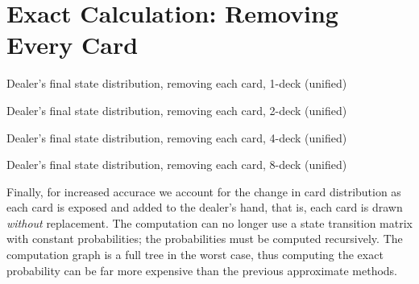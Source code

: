 \section{Exact Calculation: Removing Every Card}
\label{sec:dealer:exact}

\begin{table}[ht!]
\caption{Dealer's final state distribution, removing each card, 1-deck (unified)}
\begin{center}

\end{center}
\label{tab:dealer-final-unified-exact-1}
\end{table}

\begin{table}[ht!]
\caption{Dealer's final state distribution, removing each card, 2-deck (unified)}
\begin{center}

\end{center}
\label{tab:dealer-final-unified-exact-2}
\end{table}

\begin{table}[ht!]
\caption{Dealer's final state distribution, removing each card, 4-deck (unified)}
\begin{center}

\end{center}
\label{tab:dealer-final-unified-exact-4}
\end{table}

\begin{table}[ht!]
\caption{Dealer's final state distribution, removing each card, 8-deck (unified)}
\begin{center}

\end{center}
\label{tab:dealer-final-unified-exact-8}
\end{table}

Finally, for increased accurace we account for the change in 
card distribution as each card is exposed and added to the dealer's hand, 
that is, each card is drawn \emph{without} replacement.
The computation can no longer use a state transition matrix with
constant probabilities; 
the probabilities must be computed recursively.
The computation graph is a full tree in the worst case, 
thus computing the exact probability can be far more expensive
than the previous approximate methods.  

